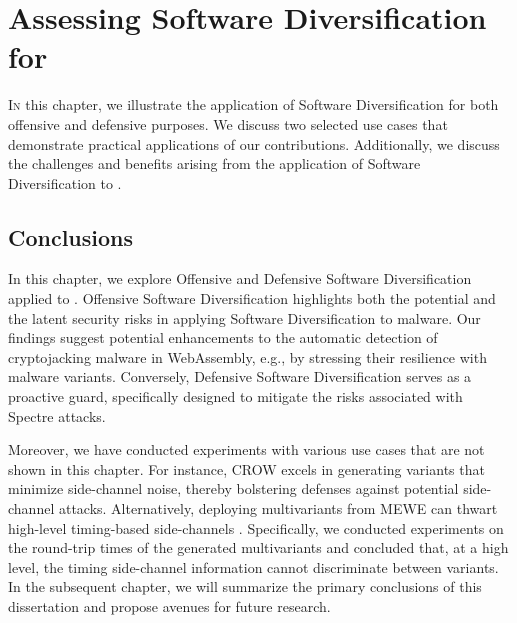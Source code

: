 \chapter{Assessing Software Diversification for \Wasm}
\label{exploit}




\vspace{12mm}

\lettrine[lines=3]{I}{n} this chapter, we illustrate the application of Software Diversification for both offensive and defensive purposes.
We discuss two selected use cases that demonstrate practical applications of our contributions.
Additionally, we discuss the challenges and benefits arising from the application of Software Diversification to \Wasm.









% 

\section*{Conclusions}
In this chapter, we explore Offensive and Defensive Software Diversification applied to \Wasm.
Offensive Software Diversification highlights both the potential and the latent security risks in applying Software Diversification to \Wasm malware. 
Our findings suggest potential enhancements to the automatic detection of cryptojacking malware in WebAssembly, e.g., by stressing their resilience with \Wasm malware variants. 
Conversely, Defensive Software Diversification serves as a proactive guard, specifically designed to mitigate the risks associated with Spectre attacks. 

Moreover, we have conducted experiments with various use cases that are not shown in this chapter.
For instance, CROW \cite{CROW} excels in generating \Wasm variants that minimize side-channel noise, thereby bolstering defenses against potential side-channel attacks. 
Alternatively, deploying multivariants from MEWE \cite{MEWE} can thwart high-level timing-based side-channels \cite{morgan2015web}. 
Specifically, we conducted experiments on the round-trip times of the generated multivariants and concluded that, at a high level, the timing side-channel information cannot discriminate between variants. 
In the subsequent chapter, we will summarize the primary conclusions of this dissertation and propose avenues for future research.
